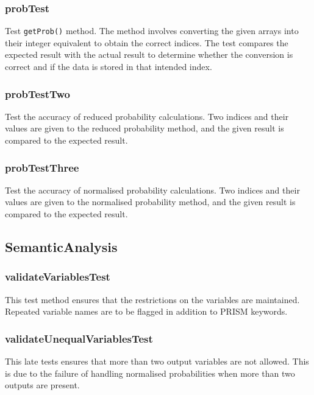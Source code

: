 \documentclass[report.tex]{subfiles}
\begin{document}
\subsubsection{probTest} %
\label{ssub:probTest}
Test \texttt{getProb()} method. The method involves converting the given arrays
into their integer equivalent to obtain the correct indices. The test compares
the expected result with the actual result to determine whether the conversion
is correct and if the data is stored in that intended index.

\subsubsection{probTestTwo} %
\label{ssub:probTestTwo}
Test the accuracy of reduced probability calculations. Two indices and their
values are given to the reduced probability method, and the given result is
compared to the expected result.

\subsubsection{probTestThree} %
\label{ssub:probTestThree}
Test the accuracy of normalised probability calculations. Two indices and their
values are given to the normalised probability method, and the given result is
compared to the expected result.

\subsection{SemanticAnalysis} %
\label{sub:semanticanalysis}
\subsubsection{validateVariablesTest} %
\label{ssub:validatevariablestest}
This test method ensures that the restrictions on the variables are maintained.
Repeated variable names are to be flagged in addition to PRISM keywords.

\subsubsection{validateUnequalVariablesTest} %
\label{ssub:validateunequalvariablestest}
This late tests ensures that more than two output variables are not allowed.
This is due to the failure of handling normalised probabilities when more than
two outputs are present.
\end{document}
